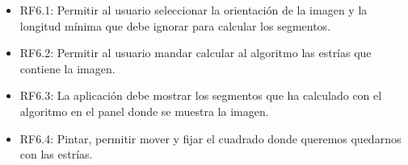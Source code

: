 \begin{itemize}
\begin{itemize}
		\item RF6.1: Permitir al usuario seleccionar la orientación de la imagen y la longitud mínima que debe ignorar para calcular los segmentos. 
		\item RF6.2: Permitir al usuario mandar calcular al algoritmo las estrías que contiene la imagen.
		\item RF6.3: La aplicación debe mostrar los segmentos que ha calculado con el algoritmo en el panel donde se muestra la imagen.					
		\item RF6.4: Pintar, permitir mover y fijar el cuadrado donde queremos quedarnos con las estrías.
	\end{itemize}

\end{itemize}					
			 
